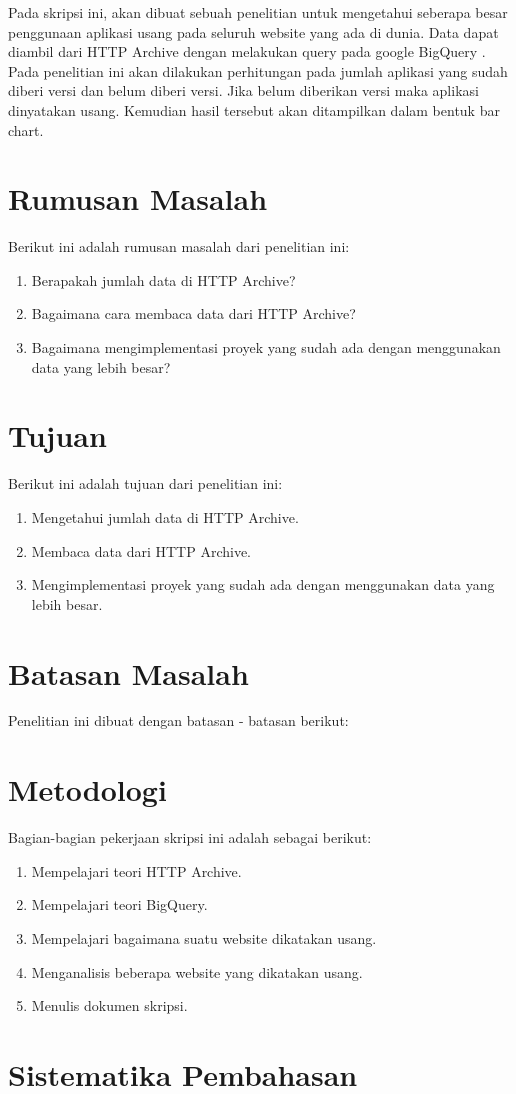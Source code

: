 Pada skripsi ini, akan dibuat sebuah penelitian untuk mengetahui seberapa besar penggunaan aplikasi usang pada seluruh website yang ada di dunia. Data dapat diambil dari HTTP Archive dengan melakukan query pada google BigQuery . Pada penelitian ini akan dilakukan perhitungan pada jumlah aplikasi yang sudah diberi versi dan belum diberi versi. Jika belum diberikan versi maka aplikasi dinyatakan usang. Kemudian hasil tersebut akan ditampilkan dalam bentuk bar chart.


\section{Rumusan Masalah}
\label{sec:rumusan}
Berikut ini adalah rumusan masalah dari penelitian ini:
\begin{enumerate}
	\item Berapakah jumlah data di HTTP Archive?
	\item Bagaimana cara membaca data dari HTTP Archive?
	\item Bagaimana mengimplementasi proyek yang sudah ada dengan menggunakan data yang lebih besar?
\end{enumerate}


\section{Tujuan}
\label{sec:tujuan}
Berikut ini adalah tujuan dari penelitian ini:
\begin{enumerate}
	\item Mengetahui jumlah data di HTTP Archive.
	\item Membaca data dari HTTP Archive.
	\item Mengimplementasi proyek yang sudah ada dengan menggunakan data yang lebih besar.
\end{enumerate}


\section{Batasan Masalah}
\label{sec:batasan}
Penelitian ini dibuat dengan batasan - batasan berikut:


\section{Metodologi}
\label{sec:metlit}
Bagian-bagian pekerjaan skripsi ini adalah sebagai berikut:
\begin{enumerate}
	\item Mempelajari teori HTTP Archive.
	\item Mempelajari teori BigQuery.
	\item Mempelajari bagaimana suatu website dikatakan usang.
	\item Menganalisis beberapa website yang dikatakan usang.
	\item Menulis dokumen skripsi.
\end{enumerate}


\section{Sistematika Pembahasan}
\label{sec:sispem}
